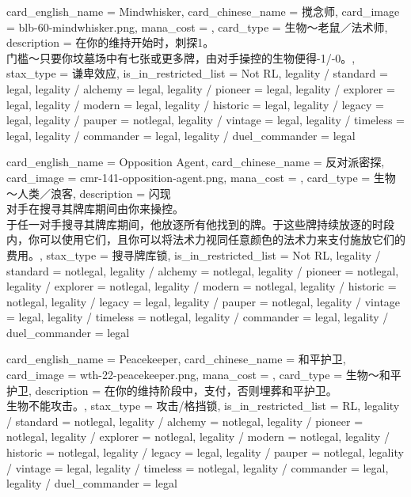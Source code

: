 \documentclass[lang = cn, color = black, 10pt]{AllThatStax}
\begin{document}
\card
{
	card_english_name = {Mindwhisker},
	card_chinese_name = {搅念师},
	card_image = blb-60-mindwhisker.png,
	mana_cost = ,
	card_type = 生物～老鼠／法术师,
	description = {在你的维持开始时，刺探1。\\
门槛～只要你坟墓场中有七张或更多牌，由对手操控的生物便得-1/-0。},
	stax_type = 谦卑效应,
	is_in_restricted_list = Not RL,
	legality / standard = legal,
	legality / alchemy = legal,
	legality / pioneer = legal,
	legality / explorer = legal,
	legality / modern = legal,
	legality / historic = legal,
	legality / legacy = legal,
	legality / pauper = notlegal,
	legality / vintage = legal,
	legality / timeless = legal,
	legality / commander = legal,
	legality / duel_commander = legal
}

\card
{
	card_english_name = {Opposition Agent},
	card_chinese_name = {反对派密探},
	card_image = cmr-141-opposition-agent.png,
	mana_cost = ,
	card_type = 生物～人类／浪客,
	description = {闪现\\
对手在搜寻其牌库期间由你来操控。\\
于任一对手搜寻其牌库期间，他放逐所有他找到的牌。于这些牌持续放逐的时段内，你可以使用它们，且你可以将法术力视同任意颜色的法术力来支付施放它们的费用。},
	stax_type = 搜寻牌库锁,
	is_in_restricted_list = Not RL,
	legality / standard = notlegal,
	legality / alchemy = notlegal,
	legality / pioneer = notlegal,
	legality / explorer = notlegal,
	legality / modern = notlegal,
	legality / historic = notlegal,
	legality / legacy = legal,
	legality / pauper = notlegal,
	legality / vintage = legal,
	legality / timeless = notlegal,
	legality / commander = legal,
	legality / duel_commander = legal
}

\card
{
	card_english_name = {Peacekeeper},
	card_chinese_name = {和平护卫},
	card_image = wth-22-peacekeeper.png,
	mana_cost = ,
	card_type = 生物～和平护卫,
	description = {在你的维持阶段中，支付，否则埋葬和平护卫。\\
生物不能攻击。},
	stax_type = 攻击/格挡锁,
	is_in_restricted_list = RL,
	legality / standard = notlegal,
	legality / alchemy = notlegal,
	legality / pioneer = notlegal,
	legality / explorer = notlegal,
	legality / modern = notlegal,
	legality / historic = notlegal,
	legality / legacy = legal,
	legality / pauper = notlegal,
	legality / vintage = legal,
	legality / timeless = notlegal,
	legality / commander = legal,
	legality / duel_commander = legal
}
\end{document}
